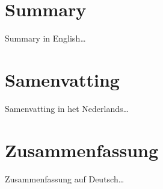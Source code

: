 \chapter*{Summary}

{\color{title}
Summary in English\ldots
}
\afterpage{\pagecolor{none}}

\chapter*{Samenvatting}

{\color{title}
Samenvatting in het Nederlands\ldots
}

\afterpage{\pagecolor{none}}

\chapter*{Zusammenfassung}

{\color{title}
	Zusammenfassung auf Deutsch\ldots
}

\afterpage{\pagecolor{none}}